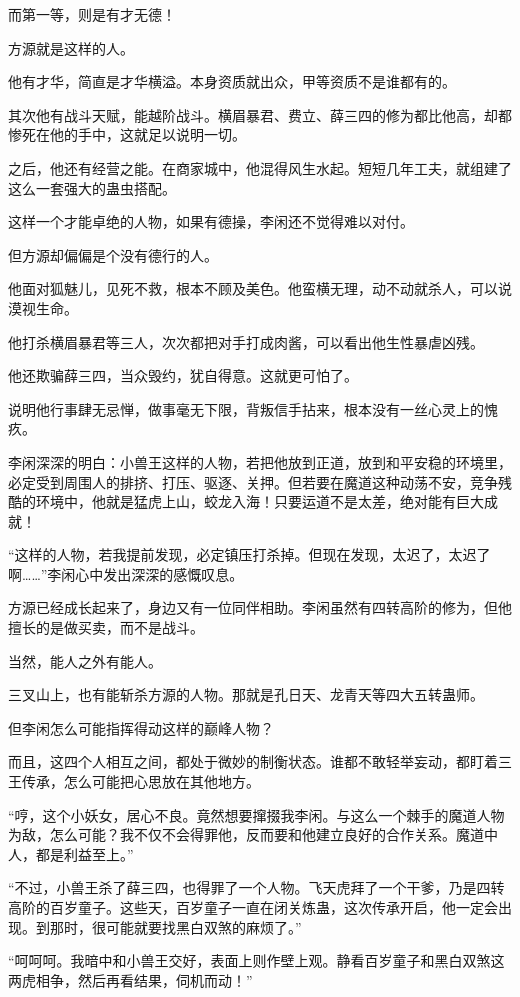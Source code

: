 \begin{this_body}
而第一等，则是有才无德！

方源就是这样的人。

他有才华，简直是才华横溢。本身资质就出众，甲等资质不是谁都有的。

其次他有战斗天赋，能越阶战斗。横眉暴君、费立、薛三四的修为都比他高，却都惨死在他的手中，这就足以说明一切。

之后，他还有经营之能。在商家城中，他混得风生水起。短短几年工夫，就组建了这么一套强大的蛊虫搭配。

这样一个才能卓绝的人物，如果有德操，李闲还不觉得难以对付。

但方源却偏偏是个没有德行的人。

他面对狐魅儿，见死不救，根本不顾及美色。他蛮横无理，动不动就杀人，可以说漠视生命。

他打杀横眉暴君等三人，次次都把对手打成肉酱，可以看出他生性暴虐凶残。

他还欺骗薛三四，当众毁约，犹自得意。这就更可怕了。

说明他行事肆无忌惮，做事毫无下限，背叛信手拈来，根本没有一丝心灵上的愧疚。

李闲深深的明白：小兽王这样的人物，若把他放到正道，放到和平安稳的环境里，必定受到周围人的排挤、打压、驱逐、关押。但若要在魔道这种动荡不安，竞争残酷的环境中，他就是猛虎上山，蛟龙入海！只要运道不是太差，绝对能有巨大成就！

“这样的人物，若我提前发现，必定镇压打杀掉。但现在发现，太迟了，太迟了啊……”李闲心中发出深深的感慨叹息。

方源已经成长起来了，身边又有一位同伴相助。李闲虽然有四转高阶的修为，但他擅长的是做买卖，而不是战斗。

当然，能人之外有能人。

三叉山上，也有能斩杀方源的人物。那就是孔日天、龙青天等四大五转蛊师。

但李闲怎么可能指挥得动这样的巅峰人物？

而且，这四个人相互之间，都处于微妙的制衡状态。谁都不敢轻举妄动，都盯着三王传承，怎么可能把心思放在其他地方。

“哼，这个小妖女，居心不良。竟然想要撺掇我李闲。与这么一个棘手的魔道人物为敌，怎么可能？我不仅不会得罪他，反而要和他建立良好的合作关系。魔道中人，都是利益至上。”

“不过，小兽王杀了薛三四，也得罪了一个人物。飞天虎拜了一个干爹，乃是四转高阶的百岁童子。这些天，百岁童子一直在闭关炼蛊，这次传承开启，他一定会出现。到那时，很可能就要找黑白双煞的麻烦了。”

“呵呵呵。我暗中和小兽王交好，表面上则作壁上观。静看百岁童子和黑白双煞这两虎相争，然后再看结果，伺机而动！”


\end{this_body}
